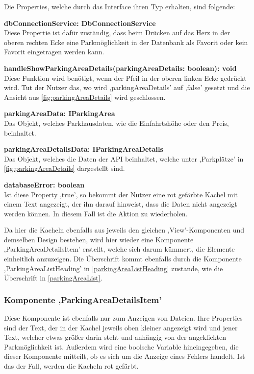 Die Properties, welche durch das Interface ihren Typ erhalten, sind folgende: 
\begin{description}
	\item \textbf{dbConnectionService: DbConnectionService} \\ Diese Propertie ist dafür zuständig, dass beim Drücken auf das Herz in der oberen rechten Ecke eine Parkmöglichkeit in der Datenbank als Favorit oder kein Favorit eingetragen werden kann.
	\item \textbf{handleShowParkingAreaDetails(parkingAreaDetails: boolean): void} \\ Diese Funktion wird benötigt, wenn der Pfeil in der oberen linken Ecke gedrückt wird. Tut der Nutzer das, wo wird ,parkingAreaDetails' auf ,false' gesetzt und die Ansicht aus \autoref{fig:parkingAreaDetails} wird geschlossen.
	\item \textbf{parkingAreaData: IParkingArea} \\ Das Objekt, welches Parkhausdaten, wie die Einfahrtshöhe oder den Preis, beinhaltet.
	\item \textbf{parkingAreaDetailsData: IParkingAreaDetails} \\ Das Objekt, welches die Daten der API beinhaltet, welche unter ,Parkplätze' in \autoref{fig:parkingAreaDetails} dargestellt sind.
	\item \textbf{databaseError: boolean} \\ Ist diese Property ,true', so bekommt der Nutzer eine rot gefärbte Kachel mit einem Text angezeigt, der ihn darauf hinweist, dass die Daten nicht angezeigt werden können. In diesem Fall ist die Aktion zu wiederholen.
\end{description}

Da hier die Kacheln ebenfalls aus jeweils den gleichen ,View'-Komponenten und demselben Design bestehen, wird hier wieder eine Komponente ,ParkingAreaDetailsItem' erstellt, welche sich darum kümmert, die Elemente einheitlich anzuzeigen. Die Überschrift kommt ebenfalls durch die Komponente ,ParkingAreaListHeading' in \autoref{parkingAreaListHeading} zustande, wie die Überschrift in \autoref{parkingAreaList}.

\subsubsection{Komponente ,ParkingAreaDetailsItem'}
Diese Komponente ist ebenfalls nur zum Anzeigen von Dateien. Ihre Properties sind der Text, der in der Kachel jeweils oben kleiner angezeigt wird und jener Text, welcher etwas größer darin steht und anhängig von der angeklickten Parkmöglichkeit ist. Außerdem wird eine boolsche Variable hineingegeben, die dieser Komponente mitteilt, ob es sich um die Anzeige eines Fehlers handelt. Ist das der Fall, werden die Kacheln rot gefärbt.

